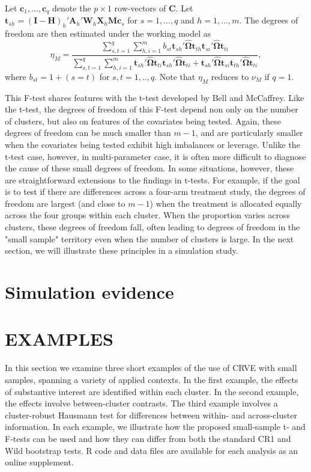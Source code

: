 \documentclass[12pt]{article}\usepackage[]{graphicx}\usepackage[]{color}
\newcommand{\bm}{\mathbf}
\newcommand{\bs}{\boldsymbol}
\begin{document}
Let $\bm{c}_1,...,\bm{c}_q$ denote the $p \times 1$ row-vectors of $\bm{C}$. 
Let $\bm{t}_{sh} = \left(\bm{I} - \bm{H}\right)_h'\bm{A}_h'\bm{W}_h\bm{X}_h\bm{M}\bm{c}_s$ for $s = 1,...,q$ and $h = 1,...,m$. 
The degrees of freedom are then estimated under the working model as
\begin{equation}
\label{eq:eta_model}
\eta_M = \frac{\sum_{s,t=1}^q \sum_{h,i=1}^m b_{st} \bm{t}_{sh}'\hat{\bs\Omega}\bm{t}_{th} \bm{t}_{si}'\hat{\bs\Omega}\bm{t}_{ti}}{\sum_{s,t=1}^q \sum_{h,i=1}^m \bm{t}_{sh}'\hat{\bs\Omega}\bm{t}_{ti} \bm{t}_{sh}'\hat{\bs\Omega}\bm{t}_{ti} + \bm{t}_{sh}'\hat{\bs\Omega}\bm{t}_{si} \bm{t}_{th}'\hat{\bs\Omega}\bm{t}_{ti}},
\end{equation}
where $b_{st} = 1 + (s=t)$ for $s,t=1,..,q$.
Note that $\eta_M$ reduces to $\nu_M$ if $q = 1$.

This F-test shares features with the t-test developed by Bell and McCaffrey. Like the t-test, the degrees of freedom of this F-test depend non only on the number of clusters, but also on features of the covariates being tested. Again, these degrees of freedom can be much smaller than $m - 1$, and are particularly smaller when the covariates being tested exhibit high imbalances or leverage. Unlike the t-test case, however, in multi-parameter case, it is often more difficult to diagnose the cause of these small degrees of freedom. In some situations, however, these are straightforward extensions to the findings in t-tests. For example, if the goal is to test if there are differences across a four-arm treatment study, the degrees of freedom are largest (and close to $m - 1$) when the treatment is allocated equally across the four groups within each cluster. When the proportion varies across clusters, these degrees of freedom fall, often leading to degrees of freedom in the "small sample" territory even when the number of clusters is large. In the next section, we will illustrate these principles in a simulation study.

\section{Simulation evidence}
\label{subsec:simulations}

\section{EXAMPLES}
\label{subsec:examples_F}

In this section we examine three short examples of the use of CRVE with small samples, spanning a variety of applied contexts. In the first example, the effects of substantive interest are identified within each cluster. In the second example, the effects involve between-cluster contrasts. The third example involves a cluster-robust Hausmann test for differences between within- and across-cluster information. In each example, we illustrate how the proposed small-sample t- and F-tests can be used and how they can differ from both the standard CR1 and Wild bootstrap tests. R code and data files are available for each analysis as an online supplement.
\end{document}
